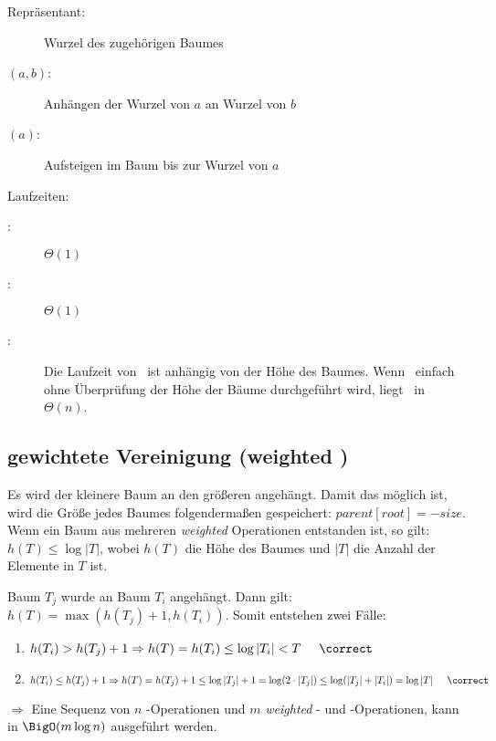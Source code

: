 \begin{description}
	\item[Repräsentant:] Wurzel des zugehörigen Baumes
	\item[\union$(a,b)$:] Anhängen der Wurzel von $a$ an Wurzel von $b$
	\item[\find$(a)$:] Aufsteigen im Baum bis zur Wurzel von $a$
\end{description}
Laufzeiten:
\begin{description}
\item[\makeset:] $\Theta(1)$
\item[\union:] $\Theta(1)$
\item[\find:] Die Laufzeit von \find~ist anhängig von der Höhe des Baumes. Wenn \union~einfach ohne Überprüfung der Höhe der Bäume durchgeführt wird, liegt \find~in $\Theta(n)$.
\end{description}

\subsection{gewichtete Vereinigung (weighted \union)}
Es wird der kleinere Baum an den größeren angehängt. Damit das möglich ist, wird die Größe jedes Baumes folgendermaßen gespeichert: $parent[root] = -size$.\\
Wenn ein Baum aus mehreren \emph{weighted \union} Operationen entstanden ist, so gilt: $h(T) \leq \log |T|$, wobei $h(T)$ die Höhe des Baumes und $|T|$ die Anzahl der Elemente in $T$ ist.

\topbreak

\up Baum $T_j$ wurde an Baum $T_i$ angehängt. Dann gilt: $h(T) = \max(h(T_j)+1,h(T_i))$. Somit entstehen zwei Fälle:
\begin{enumerate}
	\item $h(T_i) > h(T_j)+1 \Rightarrow h(T) =h(T_i) \leq \log |T_i| < T\hspace*{0.5cm} \correct$
	\item $h(T_i) \leq h(T_j)+1\\
	\Rightarrow h(T) = h(T_j)+1 \leq \log |T_j| +1 = \log(2\cdot |T_j|) \leq \log(|T_j|+|T_i|) = \log |T| \hspace*{0.5cm} \correct$
\end{enumerate}
$\Rightarrow $ Eine Sequenz von $n$ \makeset-Operationen und $m$ \emph{weighted} \union- und \find-Operationen, kann in $\BigO(m \log n)$ ausgeführt werden.


